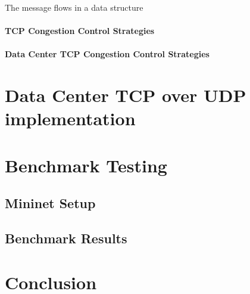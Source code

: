 \documentclass[%
 reprint,
amsmath,amssymb,
aps,
]{revtex4-2}
\begin{document}
The message flows in a data structure 

\paragraph{TCP Congestion Control Strategies}

\paragraph{Data Center TCP Congestion Control Strategies}

\section{Data Center TCP over UDP implementation}

\section{Benchmark Testing}
\subsection{Mininet Setup}
\subsection{Benchmark Results}

\section{Conclusion}
\end{document}
